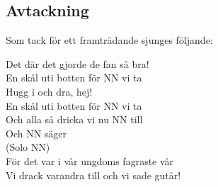 \begin{flushleft}
\section{Avtackning}
\end{flushleft}
{\large
Som tack för ett framträdande sjunges följande:

\begin{flushleft}
Det där det gjorde de fan så bra!\\
En skål uti botten för NN vi ta\\
\repopen Hugg i och dra, hej! \repclose\\
En skål uti botten för NN vi ta\\
Och alla så dricka vi nu NN till\\
Och NN säger\\
(Solo NN)\\
För det var i vår ungdoms fagraste vår\\
Vi drack varandra till och vi sade gutår!\\
\end{flushleft}
}
